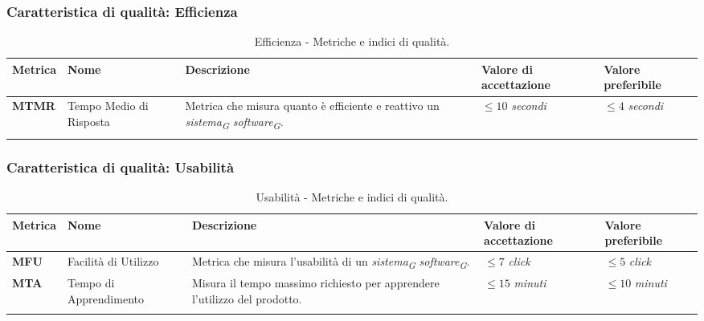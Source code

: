 \subsubsection{Caratteristica di qualità: Efficienza}
\hspace{1pt}
        \begin{longtable}{|C{1.5cm}|L{3cm}|L{4cm}|L{2.5cm}|L{2.5cm}|}
                    \hline
                    \textbf{Metrica} & \textbf{Nome} & \textbf{Descrizione} & \textbf{Valore di accettazione} & \textbf{Valore preferibile} \\
                    \hline
                    \textbf{MTMR} & Tempo Medio di Risposta & Metrica che misura quanto è efficiente e reattivo un \textit{sistema}\textsubscript{\textit{G}} \textit{software}\textsubscript{\textit{G}}. & $\leq 10$ \textit{secondi}  & $\leq 4$ \textit{secondi} \\

                    \hline
                    \caption{Efficienza - Metriche e indici di qualità.}
        \label{tab:metriche_efficienza_testo}
    \end{longtable}

\subsubsection{Caratteristica di qualità: Usabilità}
\hspace{1pt}
            \begin{longtable}{|C{1.5cm}|L{3cm}|L{4cm}|L{2.5cm}|L{2.5cm}|}
                        \hline
                        \textbf{Metrica} & \textbf{Nome} & \textbf{Descrizione} & \textbf{Valore di accettazione} & \textbf{Valore preferibile} \\
                        \hline
                        \textbf{MFU} & Facilità di Utilizzo & Metrica che misura l'usabilità di un \textit{sistema}\textsubscript{\textit{G}} \textit{software}\textsubscript{\textit{G}}. & $\leq 7$ \textit{click}  & $\leq 5$ \textit{click} \\
                        \hline
                        \textbf{MTA} & Tempo di Apprendimento & Misura il tempo massimo richiesto per apprendere l'utilizzo del prodotto. & $\leq 15$ \textit{minuti}  & $\leq 10$ \textit{minuti} \\
                        \hline
                        \caption{Usabilità - Metriche e indici di qualità.}
            \label{tab:metriche_usabilità_testo}
        \end{longtable}

